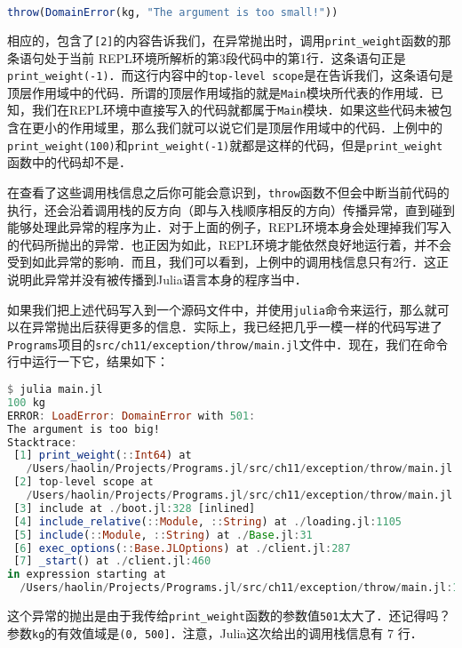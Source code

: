 \begin{lstlisting}[language=julia]
throw(DomainError(kg, "The argument is too small!"))
\end{lstlisting}

相应的，包含了\verb|[2]|的内容告诉我们，在异常抛出时，调用\verb|print_weight|函数的那条语句处于当前 REPL环境所解析的第3段代码中的第1行．这条语句正是\verb|print_weight(-1)|．而这行内容中的\verb|top-level scope|是在告诉我们，这条语句是顶层作用域中的代码．所谓的顶层作用域指的就是\verb|Main|模块所代表的作用域．已知，我们在REPL环境中直接写入的代码就都属于\verb|Main|模块．如果这些代码未被包含在更小的作用域里，那么我们就可以说它们是顶层作用域中的代码．上例中的\verb|print_weight(100)|和\verb|print_weight(-1)|就都是这样的代码，但是\verb|print_weight|函数中的代码却不是．

在查看了这些调用栈信息之后你可能会意识到，\verb|throw|函数不但会中断当前代码的执行，还会沿着调用栈的反方向（即与入栈顺序相反的方向）传播异常，直到碰到能够处理此异常的程序为止．对于上面的例子，REPL环境本身会处理掉我们写入的代码所抛出的异常．也正因为如此，REPL环境才能依然良好地运行着，并不会受到如此异常的影响．而且，我们可以看到，上例中的调用栈信息只有2行．这正说明此异常并没有被传播到Julia语言本身的程序当中．

如果我们把上述代码写入到一个源码文件中，并使用\verb|julia|命令来运行，那么就可以在异常抛出后获得更多的信息．实际上，我已经把几乎一模一样的代码写进了\verb|Programs|项目的\verb|src/ch11/exception/throw/main.jl|文件中．现在，我们在命令行中运行一下它，结果如下：

\begin{lstlisting}[language=julia]
$ julia main.jl 
100 kg
ERROR: LoadError: DomainError with 501:
The argument is too big!
Stacktrace:
 [1] print_weight(::Int64) at 
   /Users/haolin/Projects/Programs.jl/src/ch11/exception/throw/main.jl:11
 [2] top-level scope at 
   /Users/haolin/Projects/Programs.jl/src/ch11/exception/throw/main.jl:17
 [3] include at ./boot.jl:328 [inlined]
 [4] include_relative(::Module, ::String) at ./loading.jl:1105
 [5] include(::Module, ::String) at ./Base.jl:31
 [6] exec_options(::Base.JLOptions) at ./client.jl:287
 [7] _start() at ./client.jl:460
in expression starting at 
  /Users/haolin/Projects/Programs.jl/src/ch11/exception/throw/main.jl:17
\end{lstlisting}

这个异常的抛出是由于我传给\verb|print_weight|函数的参数值\verb|501|太大了．还记得吗？参数\verb|kg|的有效值域是\verb|(0, 500]|．注意，Julia这次给出的调用栈信息有 7 行．

